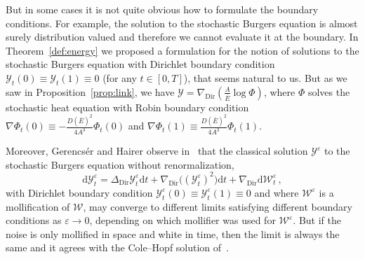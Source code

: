 \documentclass[AHL,Unicode,longabstracts]{cedram}
\DeclareMathOperator{\Dir}{Dir}
\newcommand{\mc}[1]{{\mathcal #1}}
\renewcommand{\mc}[1]{{\mathcal #1}}
\renewcommand{\bar}{\overline}
\newcommand*{\dd}{\mathrm{d}}
\newcommand*{\dt}{\dd t}
\renewcommand{\tfrac}{\frac}
\begin{document}
But in some cases it is not quite obvious how to formulate the boundary conditions. For example, the solution to the stochastic Burgers equation is almost surely distribution valued and therefore we cannot evaluate it at the boundary. In Theorem~\ref{def:energy} we proposed a formulation for the notion of solutions to the stochastic Burgers equation with Dirichlet boundary condition $\mc Y_t(0) \equiv \mc Y_t(1) \equiv 0$ (for any $t \in [0,T]$), that seems natural to us. But as we saw in Proposition~\ref{prop:link}, we have $\mc Y = \nabla_{\Dir} (\frac{A}{\bar{E}} \log \Phi)$, where $\Phi$ solves the stochastic heat equation with Robin boundary condition $\nabla \Phi_t(0) \equiv - \tfrac{D(\bar{E})^2}{4A^3} \Phi_t(0)$ and $\nabla \Phi_t(1) \equiv \tfrac{D(\bar{E})^2}{4A^3} \Phi_t(1)$.

Moreover, Gerencs\'er and Hairer observe in~\cite[Theorem~1.6]{Gerencser2018} that the classical solution $\mc Y^\varepsilon$ to the stochastic Burgers equation without renormalization,
\begin{equation}\label{eq:gh-approx}
\dd\mc Y^\varepsilon_t = \Delta_{\Dir} \mc Y^\varepsilon_t \dt + \nabla_{\Dir} \big((\mc Y^\varepsilon_t)^2\big) \dt + \nabla_{\Dir} \dd\mc W^\varepsilon_t \,,
\end{equation}
with Dirichlet boundary condition $\mc Y^\varepsilon_t(0) \equiv \mc Y^\varepsilon_t(1) \equiv 0$ and where $\mc W^\varepsilon$ is a mollification of $\mc W$, may converge to different limits satisfying different boundary conditions as $\varepsilon \to 0$, depending on which mollifier was used for $\mc W^\varepsilon$. But if the noise is only mollified in space and white in time, then the limit is always the same and it agrees with the Cole--Hopf solution of~\cite{Corwin2016}.
\end{document}
